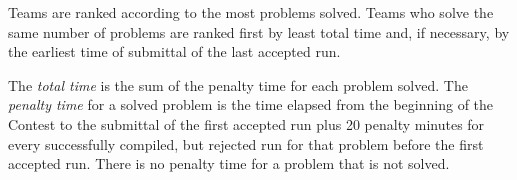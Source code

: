 
Teams are ranked according to the most problems solved.
Teams who solve the same number of problems are ranked first by least total
time and, if necessary, by the earliest time of submittal of the last
accepted run.

The \emph{total time} is the sum of the penalty time for each problem
solved.
The \emph{penalty time} for a solved problem is the time elapsed from the
beginning of the Contest to the submittal of the first accepted run plus 20
penalty minutes for every successfully compiled, but rejected run
for that problem before the first accepted run.
There is no penalty time for a problem that is not solved.
